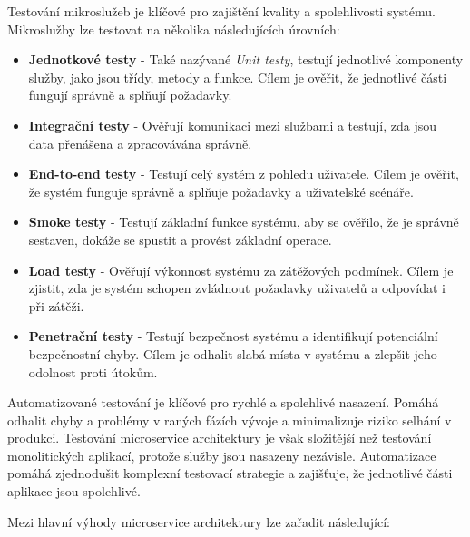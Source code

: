 
Testování mikroslužeb je klíčové pro zajištění kvality a spolehlivosti systému. Mikroslužby lze testovat na několika následujících úrovních: \cite{Richardson2018} \cite{Newman2015}

\begin{itemize}
    \item \textbf{Jednotkové testy} - Také nazývané \emph{Unit testy}, testují jednotlivé komponenty služby, jako jsou třídy, metody a funkce. Cílem je ověřit, že jednotlivé části fungují správně a splňují požadavky.
    \item \textbf{Integrační testy} - Ověřují komunikaci mezi službami a testují, zda jsou data přenášena a zpracovávána správně.
    \item \textbf{End-to-end testy} - Testují celý systém z pohledu uživatele. Cílem je ověřit, že systém funguje správně a splňuje požadavky a uživatelské scénáře.
    \item \textbf{Smoke testy} - Testují základní funkce systému, aby se ověřilo, že je správně sestaven, dokáže se spustit a provést základní operace.
    \item \textbf{Load testy} - Ověřují výkonnost systému za zátěžových podmínek. Cílem je zjistit, zda je systém schopen zvládnout požadavky uživatelů a odpovídat i při zátěži.
    \item \textbf{Penetrační testy} - Testují bezpečnost systému a identifikují potenciální bezpečnostní chyby. Cílem je odhalit slabá místa v systému a zlepšit jeho odolnost proti útokům.
\end{itemize}

Automatizované testování je klíčové pro rychlé a spolehlivé nasazení. Pomáhá odhalit chyby a problémy v raných fázích vývoje a minimalizuje riziko selhání v produkci. Testování microservice architektury je však složitější než testování monolitických aplikací, protože služby jsou nasazeny nezávisle. Automatizace pomáhá zjednodušit komplexní testovací strategie a zajišťuje, že jednotlivé části aplikace jsou spolehlivé. 


Mezi hlavní výhody microservice architektury lze zařadit následující:

